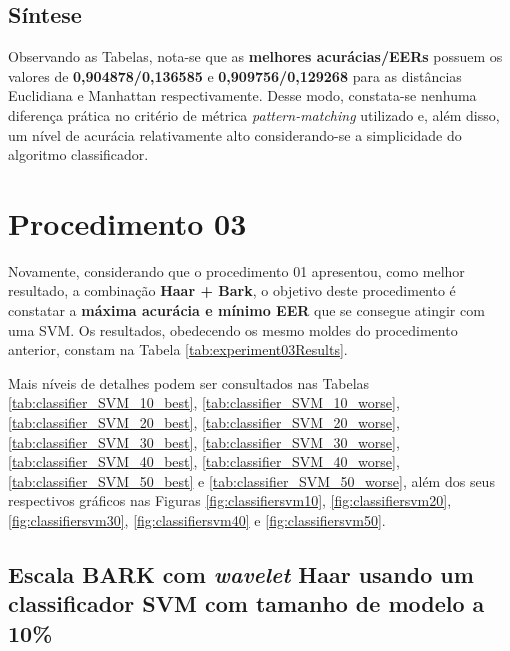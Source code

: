 			\FloatBarrier
		\subsection{Síntese}
			\par Observando as Tabelas, nota-se que as \textbf{melhores acurácias/EERs} possuem os valores de \textbf{0,904878/0,136585} e \textbf{0,909756/0,129268} para as distâncias Euclidiana e Manhattan respectivamente. Desse modo, constata-se nenhuma diferença prática no critério de métrica \textit{pattern-matching} utilizado e, além disso, um nível de acurácia relativamente alto considerando-se a simplicidade do algoritmo classificador.

	\section{Procedimento 03}
		\label{chap:testsResults:sec:Experimento03}
		\par Novamente, considerando que o procedimento 01 apresentou, como melhor resultado, a combinação \textbf{Haar + Bark}, o objetivo deste procedimento é constatar a \textbf{máxima acurácia e mínimo EER} que se consegue atingir com uma SVM. Os resultados, obedecendo os mesmo moldes do procedimento anterior, constam na Tabela \ref{tab:experiment03Results}.
		
		\par Mais níveis de detalhes podem ser consultados nas Tabelas \ref{tab:classifier_SVM_10_best}, \ref{tab:classifier_SVM_10_worse}, \ref{tab:classifier_SVM_20_best}, \ref{tab:classifier_SVM_20_worse}, \ref{tab:classifier_SVM_30_best}, \ref{tab:classifier_SVM_30_worse}, \ref{tab:classifier_SVM_40_best}, \ref{tab:classifier_SVM_40_worse}, \ref{tab:classifier_SVM_50_best} e \ref{tab:classifier_SVM_50_worse}, além dos seus respectivos gráficos nas Figuras \ref{fig:classifiersvm10}, \ref{fig:classifiersvm20}, \ref{fig:classifiersvm30}, \ref{fig:classifiersvm40} e \ref{fig:classifiersvm50}.

		
		
		\FloatBarrier
		\subsection{Escala BARK com \textit{wavelet} Haar usando um classificador SVM com tamanho de modelo a 10\%}
			
		
